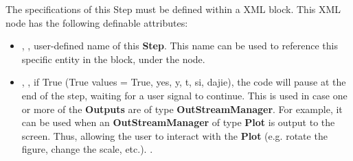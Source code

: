 The specifications of this Step must be defined within a  XML
block.
%
This XML node has the following definable attributes:
\vspace{-5mm}
\begin{itemize}
\itemsep0em
\item {}, , user-defined name of
this \textbf{Step}. \nb This name can be used to reference this specific entity
in the  block, under the  node.
\item {}, , if True
(True values = True, yes, y, t, si, dajie), the code will pause at the end of
the step, waiting for a user signal to continue. This is used in case one or
more of the \textbf{Outputs} are of type \textbf{OutStreamManager}.
For example, it can be used when an \textbf{OutStreamManager} of type
\textbf{Plot} is output to the screen. Thus, allowing the user to interact with
the \textbf{Plot} (e.g. rotate the figure, change the scale, etc.).
.
\end{itemize}

